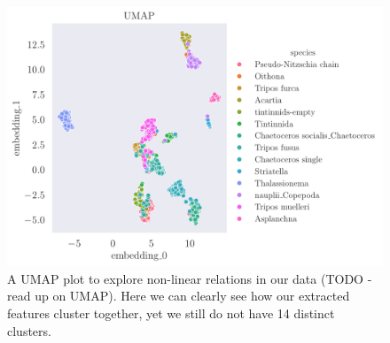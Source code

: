 \begin{figure}[H]
    \centering
    \includegraphics[width=1.1\linewidth]{examples/tests_eb/figs/umap.pdf}
    \caption{A UMAP plot to explore non-linear relations in our data (TODO - read up on UMAP). Here we can clearly see how our extracted features cluster together, yet we still do not have 14 distinct clusters.}
    \label{fig:umap}
\end{figure}

